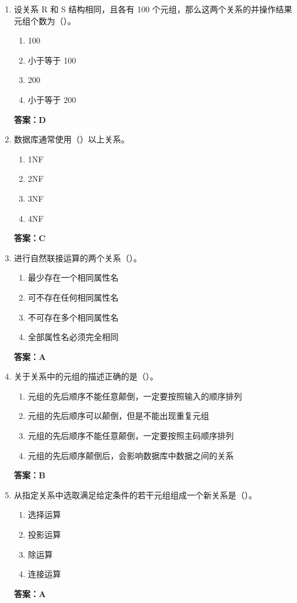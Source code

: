 \documentclass[12pt, a4paper]{article}
\begin{document}
\begin{enumerate}[label=\arabic*.]
	\item 设关系 R 和 S 结构相同，且各有 100 个元组，那么这两个关系的并操作结果元组个数为（\quad）。
	      \begin{enumerate}
		      \item 100
		      \item 小于等于 100
		      \item 200
		      \item 小于等于 200
	      \end{enumerate}
	      \textbf{答案：D}

	\item 数据库通常使用（\quad）以上关系。
	      \begin{enumerate}
		      \item 1NF
		      \item 2NF
		      \item 3NF
		      \item 4NF
	      \end{enumerate}
	      \textbf{答案：C}

	\item 进行自然联接运算的两个关系（\quad）。
	      \begin{enumerate}
		      \item 最少存在一个相同属性名
		      \item 可不存在任何相同属性名
		      \item 不可存在多个相同属性名
		      \item 全部属性名必须完全相同
	      \end{enumerate}
	      \textbf{答案：A}

	\item 关于关系中的元组的描述正确的是（\quad）。
	      \begin{enumerate}
		      \item 元组的先后顺序不能任意颠倒，一定要按照输入的顺序排列
		      \item 元组的先后顺序可以颠倒，但是不能出现重复元组
		      \item 元组的先后顺序不能任意颠倒，一定要按照主码顺序排列
		      \item 元组的先后顺序颠倒后，会影响数据库中数据之间的关系
	      \end{enumerate}
	      \textbf{答案：B}

	\item 从指定关系中选取满足给定条件的若干元组组成一个新关系是（\quad）。
	      \begin{enumerate}
		      \item 选择运算
		      \item 投影运算
		      \item 除运算
		      \item 连接运算
	      \end{enumerate}
	      \textbf{答案：A}


\end{enumerate}
\end{document}
